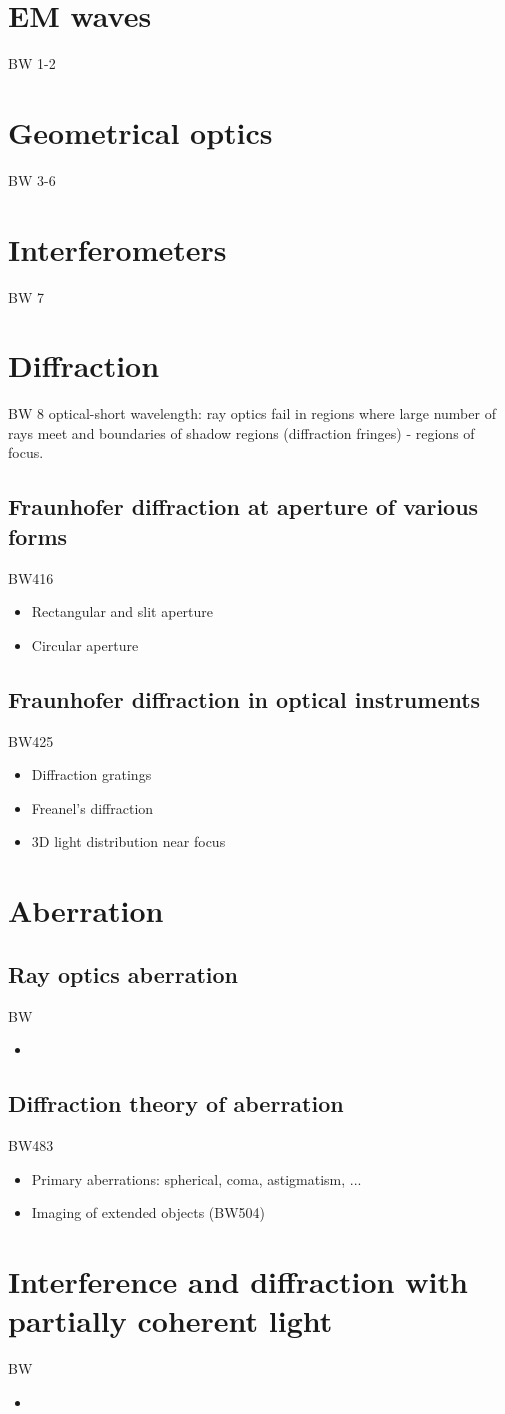 \chapter{EM waves}
BW 1-2
\chapter{Geometrical optics}
BW 3-6
\chapter{Interferometers}
BW 7
\chapter{Diffraction}
BW 8
optical-short wavelength: ray optics fail in regions where large number of rays meet and boundaries of shadow regions (diffraction fringes) - regions of focus.
\section{Fraunhofer diffraction at aperture of various forms}
BW416
\begin{itemize}
\item Rectangular and slit aperture
\item Circular aperture
\end{itemize}
\section{Fraunhofer diffraction in optical instruments}
BW425
\begin{itemize}
\item Diffraction gratings
\item Freanel's diffraction
\item 3D light distribution near focus
\end{itemize}
\chapter{Aberration}
\section{Ray optics aberration}
BW
\begin{itemize}\item \end{itemize}
\section{Diffraction theory of aberration}
BW483
\begin{itemize}
\item Primary aberrations: spherical, coma, astigmatism, ...
\item Imaging of extended objects (BW504)
\end{itemize}
\chapter{Interference and diffraction with partially coherent light}
BW
\begin{itemize}\item \end{itemize}

